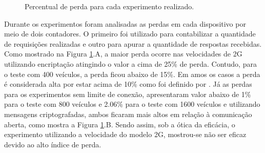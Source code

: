 \documentclass[
	12pt,				%
	oneside,			%
	a4paper,			%
	english,			%
	brazil				%
	]{abntex2ppgsi}
\begin{document}

\begin{figure}[ht!]
	\caption{Percentual de perda para cada experimento realizado.}
	\centering
	\label{fig:graficoperda}
\end{figure}  

Durante os experimentos foram analisadas as perdas em cada dispositivo por meio de dois contadores. O primeiro foi utilizado para contabilizar a quantidade de requisições realizadas  e outro para apurar a quantidade de respostas recebidas. Como mostrado na Figura \ref{fig:graficoperda}.A, a maior perda ocorre nas velocidades de 2G utilizando encriptação atingindo o valor a cima de 25\% de perda. Contudo, para o teste com 400 veículos, a perda ficou abaixo de 15\%. Em amos os casos a perda é considerada alta por estar acima de 10\% como foi definido por . Já as perdas para os experimentos  sem limite de conexão, apresentaram valor abaixo de 1\% para o teste com 800 veículos e 2.06\% para o teste com 1600 veículos e utilizando mensagens criptografadas, ambos ficaram mais altos em relação à comunicação aberta, como mostra a Figura \ref{fig:graficoperda}.B.  Sendo assim, sob a ótica da eficácia, o experimento utilizando a velocidade do modelo 2G, mostrou-se não ser eficaz devido ao alto índice de perda.
\end{document}
